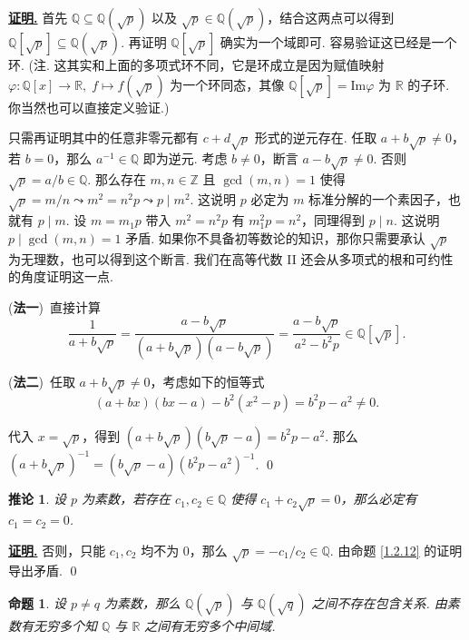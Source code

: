 \documentclass[10pt,openany]{article}
\theoremstyle{thmstyle} %
\theoremstyle{defstyle} %
\newtheorem{corollary}[theorem]{推论}
\theoremstyle{prostyle} %
\newtheorem{proposition}[theorem]{命题}
\theoremstyle{exastyle}
\theoremstyle{remstyle}
\renewenvironment{proof}[1][证明]{\par\underline{\textbf{#1.}} \;\fangsong}{\qed\par}
\begin{document}
\begin{proof}
	首先 \( \mathbb{Q} \subseteq \mathbb{Q}(\sqrt{p}) \) 以及 \( \sqrt{p} \in \mathbb{Q}(\sqrt{p}) \)，结合这两点可以得到 \( \mathbb{Q}[\sqrt{p}] \subseteq \mathbb{Q}(\sqrt{p}) \). 再证明 \( \mathbb{Q}[\sqrt{p}] \) 确实为一个域即可. 容易验证这已经是一个环. (注. 这其实和上面的多项式环不同，它是环成立是因为赋值映射 \( \varphi: \mathbb{Q}[x] \to \mathbb{R}, \; f \mapsto f(\sqrt{p}) \) 为一个环同态，其像 \( \mathbb{Q}[\sqrt{p}]=\mathrm{Im}\varphi \) 为 \( \mathbb{R} \) 的子环. 你当然也可以直接定义验证.)
	
	 只需再证明其中的任意非零元都有 \( c+d\sqrt{p} \) 形式的逆元存在. 任取 \( a+b\sqrt{p} \neq 0 \)，若 \(  b=0 \)，那么 \( a^{-1} \in \mathbb{Q} \) 即为逆元. 考虑 \( b \neq 0 \)，断言 \( a-b\sqrt{p} \neq 0 \).
     否则 \( \sqrt{p}=a/b \in \mathbb{Q} \). 那么存在 \( m,n \in \mathbb{Z} \) 且 \( \gcd(m,n)=1 \) 使得 \( \sqrt{p}=m/n \leadsto m^2=n^2p \leadsto p\mid m^2\). 这说明 \( p \) 必定为 \( m \) 标准分解的一个素因子，也就有 \( p \mid m \). 设 \( m=m_1p \) 带入 \( m^2=n^2p \) 有 \( m_1^2p=n^2 \)，同理得到 \( p \mid n \). 这说明 \( p \mid \gcd(m,n)=1 \) 矛盾. 如果你不具备初等数论的知识，那你只需要承认 \( \sqrt{p} \) 为无理数，也可以得到这个断言. 我们在高等代数 II 还会从多项式的根和可约性的角度证明这一点.
	
	(\textbf{法一})\ 直接计算
	\[ \frac{1}{a+b\sqrt{p}}=\frac{a-b\sqrt{p}}{(a+b\sqrt{p})(a-b\sqrt{p})}= \frac{a-b\sqrt{p}}{a^2-b^2p} \in \mathbb{Q}[\sqrt{p}]. \]
	
	(\textbf{法二})\ 任取 \( a+b\sqrt{p} \neq 0 \)，考虑如下的恒等式
	\[ (a+bx)(bx-a)-b^2(x^2-p)=b^2p-a^2 \neq 0. \]
	
	代入 \( x=\sqrt{p} \)，得到 \( (a+b\sqrt{p})(b\sqrt{p}-a)=b^2p-a^2 \). 那么 \( (a+b\sqrt{p})^{-1}=(b\sqrt{p}-a)(b^2p-a^2)^{-1} \).
\end{proof}

\begin{corollary}
	设 \( p \) 为素数，若存在 \( c_1,c_2 \in \mathbb{Q} \) 使得 \( c_1+c_2\sqrt{p}=0 \)，那么必定有 \( c_1=c_2=0 \).
	\label{1.2.13}
\end{corollary}

\begin{proof}
	否则，只能 \( c_1,c_2 \) 均不为 0，那么 \( \sqrt{p}=-c_1/c_2 \in \mathbb{Q} \). 由命题 \ref{1.2.12} 的证明导出矛盾.
\end{proof}

\begin{proposition}
	设 \( p \neq q \) 为素数，那么 \( \mathbb{Q}(\sqrt{p}) \) 与 \( \mathbb{Q}(\sqrt{q}) \) 之间不存在包含关系. 由素数有无穷多个知 \( \mathbb{Q} \) 与 \( \mathbb{R} \) 之间有无穷多个中间域.
\end{proposition}
\end{document}
